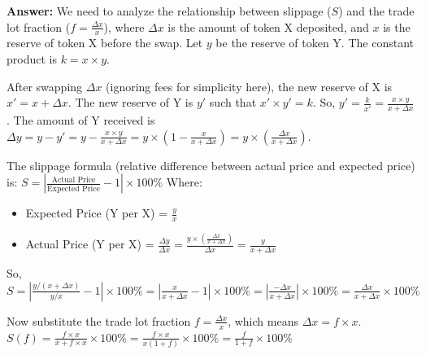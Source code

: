 \documentclass[12pt]{article}
\begin{document}
\textbf{Answer:} We need to analyze the relationship between slippage ($S$) and the trade lot fraction ($f = \frac{\Delta x}{x}$), where $\Delta x$ is the amount of token X deposited, and $x$ is the reserve of token X before the swap. Let $y$ be the reserve of token Y. The constant product is $k = x \times y$.

After swapping $\Delta x$ (ignoring fees for simplicity here), the new reserve of X is $x' = x + \Delta x$. The new reserve of Y is $y'$ such that $x' \times y' = k$. So, $y' = \frac{k}{x'} = \frac{x \times y}{x + \Delta x}$.
The amount of Y received is $\Delta y = y - y' = y - \frac{x \times y}{x + \Delta x} = y \times (1 - \frac{x}{x + \Delta x}) = y \times (\frac{\Delta x}{x + \Delta x})$.

The slippage formula (relative difference between actual price and expected price) is:
$S = \left| \frac{\text{Actual Price}}{\text{Expected Price}} - 1 \right| \times 100\%$
Where:
\begin{itemize}
    \item Expected Price (Y per X) = $\frac{y}{x}$
    \item Actual Price (Y per X) = $\frac{\Delta y}{\Delta x} = \frac{y \times (\frac{\Delta x}{x + \Delta x})}{\Delta x} = \frac{y}{x + \Delta x}$
\end{itemize}
So,
$S = \left| \frac{y / (x + \Delta x)}{y / x} - 1 \right| \times 100\% = \left| \frac{x}{x + \Delta x} - 1 \right| \times 100\% = \left| \frac{-\Delta x}{x + \Delta x} \right| \times 100\% = \frac{\Delta x}{x + \Delta x} \times 100\%$

Now substitute the trade lot fraction $f = \frac{\Delta x}{x}$, which means $\Delta x = f \times x$.\\
$S(f) = \frac{f \times x}{x + f \times x} \times 100\% = \frac{f \times x}{x(1 + f)} \times 100\% = \frac{f}{1 + f} \times 100\%$
\end{document}
